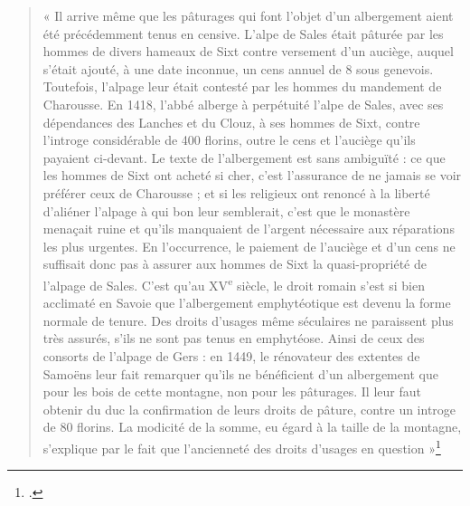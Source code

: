 \documentclass[12pt,a4paper]{report}
\begin{document}
\begin{quote}
	« Il arrive même que les pâturages qui font l’objet d’un albergement aient été précédemment tenus en censive. L’alpe de Sales était pâturée par les hommes de divers hameaux de Sixt contre versement d’un auciège, auquel s’était ajouté, à une date inconnue, un cens annuel de 8 sous genevois. Toutefois, l’alpage leur était contesté par les hommes du mandement de Charousse. En 1418, l’abbé alberge à perpétuité l’alpe de Sales, avec ses dépendances des Lanches et du Clouz, à ses hommes de Sixt, contre l’introge considérable de 400 florins, outre le cens et l’auciège qu’ils payaient ci-devant. Le texte de l’albergement est sans ambiguïté : ce que les hommes de Sixt ont acheté si cher, c’est l’assurance de ne jamais se voir préférer ceux de Charousse ; et si les religieux ont renoncé à la liberté d’aliéner l’alpage à qui bon leur semblerait, c’est que le monastère menaçait ruine et qu’ils manquaient de l’argent nécessaire aux réparations les plus urgentes. En l’occurrence, le paiement de l’auciège et d’un cens ne suffisait donc pas à assurer aux hommes de Sixt la quasi-propriété de l’alpage de Sales. C’est qu’au XV\textsuperscript{e} siècle, le droit romain s’est si bien acclimaté en Savoie que l’albergement emphytéotique est devenu la forme normale de tenure. Des droits d’usages même séculaires ne paraissent plus très assurés, s’ils ne sont pas tenus en emphytéose. Ainsi de ceux des consorts de l’alpage de Gers : en 1449, le rénovateur des extentes de Samoëns leur fait remarquer qu’ils ne bénéficient d’un albergement que pour les bois de cette montagne, non pour les pâturages. Il leur faut obtenir du duc la confirmation de leurs droits de pâture, contre un introge de 80 florins. La modicité de la somme, eu égard à la taille de la montagne, s’explique par le fait que l’ancienneté des droits d’usages en question »\footcite[312]{Carrier2001VieMontagnardeFaucigny}
\end{quote}	
\end{document}
